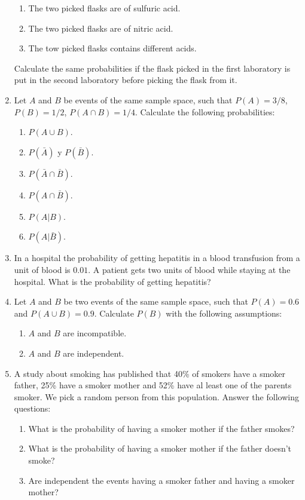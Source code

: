 \begin{enumerate}[leftmargin=*,resume]
\begin{enumerate}
\item The two picked flasks are of sulfuric acid.
\item The two picked flasks are of nitric acid.
\item The tow picked flasks contains different acids.
\end{enumerate}
Calculate the same probabilities if the flask picked in the first laboratory is put in the second laboratory before
picking the flask from it. 

\item Let $A$ and $B$ be events of the same sample space, such that $P(A)=3/8$, $P(B)=1/2$, $P(A\cap B)=1/4$.
Calculate the following probabilities:
\begin{enumerate}
\item  $P(A\cup B)$.
\item  $P(\bar A)$ y $P(\bar B)$.
\item  $P(\bar A\cap \bar B)$.
\item  $P(A\cap \bar B)$.
\item  $P(A|B)$.
\item  $P(A|\bar B)$.
\end{enumerate}

\item In a hospital the probability of getting hepatitis in a blood transfusion from a unit of blood is $0.01$.
A patient gets two units of blood while staying at the hospital.
What is the probability of getting hepatitis?

\item Let $A$ and $B$ be two events of the same sample space, such that $P(A)=0.6$ and $P(A\cup B)=0.9.$
Calculate $P(B)$ with the following assumptions:
\begin{enumerate}
\item $A$ and $B$ are incompatible.
\item $A$ and $B$ are independent.
\end{enumerate}

\item A study about smoking has published that 40\% of smokers have a smoker father, 25\% have a smoker mother and 52\%
have al least one of the parents smoker.
We pick a random person from this population.
Answer the following questions: 
\begin{enumerate}
\item What is the probability of having a smoker mother if the father smokes?
\item What is the probability of having a smoker mother if the father doesn't smoke?
\item Are independent the events having a smoker father and having a smoker mother?
\end{enumerate}


\end{enumerate}
